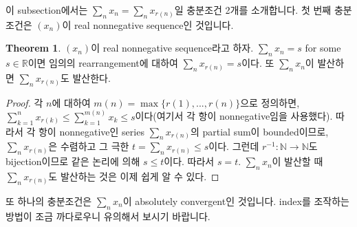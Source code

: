 \documentclass[12pt]{article}
\theoremstyle{definition}
\newtheorem{thm}{Theorem}[section]
\def\NN{\mathbb{N}}
\def\RR{\mathbb{R}}
\begin{document}
이 subsection에서는 \(\sum_n x_n = \sum_n x_{r(n)}\)일 충분조건 2개를 소개합니다. 첫 번째 충분조건은 \((x_n)\)이 real nonnegative sequence인 것입니다.

	\begin{thm}
		\((x_n)\)이 real nonnegative sequence라고 하자. \(\sum_n x_n = s\) for some \(s \in \RR\)이면 임의의 rearrangement에 대하여 \(\sum_n x_{r(n)} = s\)이다. 또 \(\sum_n x_n\)이 발산하면 \(\sum_n x_{r(n)}\)도 발산한다.
	\end{thm}
	\begin{proof}
		각 \(n\)에 대하여 \(m(n) = \max \{r(1), ..., r(n)\}\)으로 정의하면, \(\sum_{k=1}^n x_{r(k)} \le \sum_{k=1}^{m(n)} x_k \le s\)이다(여기서 각 항이 nonnegative임을 사용했다). 따라서 각 항이 nonnegative인 series \(\sum_n x_{r(n)}\)의 partial sum이 bounded이므로, \(\sum_n x_{r(n)}\)은 수렴하고 그 극한 \(t = \sum_n x_{r(n)} \le s\)이다. 그런데 \(r^{-1}:\NN \rightarrow \NN\)도 bijection이므로 같은 논리에 의해 \(s \le t\)이다. 따라서 \(s = t\). \(\sum_n x_n\)이 발산할 때 \(\sum_n x_{r(n)}\)도 발산하는 것은 이제 쉽게 알 수 있다.
	\end{proof}

또 하나의 충분조건은 \(\sum_n x_n\)이 absolutely convergent인 것입니다. index를 조작하는 방법이 조금 까다로우니 유의해서 보시기 바랍니다.
\end{document}
